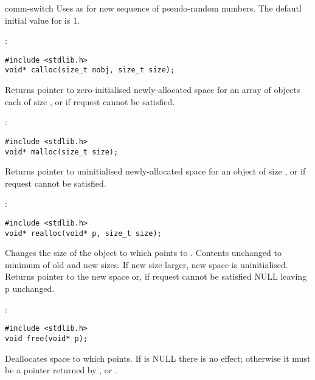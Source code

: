 \begin{Ventry2}{comm-switch  }
     Uses  as  for new sequence of pseudo-random
     numbers. The defautl initial  value for  is 1.

\item[calloc]
\label{item:calloc}
:
\begin{production}
\begin{verbatim}
#include <stdlib.h>
void* calloc(size_t nobj, size_t size);
\end{verbatim}
\end{production}

     Returns pointer to zero-initialised newly-allocated space for an
     array of  objects each of size , or  if
     request cannot be satisfied.

\item[malloc]
\label{item:malloc}
:
\begin{production}
\begin{verbatim}
#include <stdlib.h>
void* malloc(size_t size);
\end{verbatim}
\end{production}

     Returns pointer to uninitialised newly-allocated space for an
     object of size , or  if request cannot be
     satisfied.

\item[realloc]
\label{item:realloc}
:
\begin{production}
\begin{verbatim}
#include <stdlib.h>
void* realloc(void* p, size_t size);
\end{verbatim}
\end{production}

     Changes the size of the object to which  points to
     . Contents unchanged to minimum of old and new sizes. If
     new size larger, new space is uninitialised. Returns pointer to
     the new space or, if request cannot be satisfied NULL leaving p
     unchanged.

\item[free]
\label{item:free}
:
\begin{production}
\begin{verbatim}
#include <stdlib.h>
void free(void* p);
\end{verbatim}
\end{production}

     Deallocates space to which  points. If  is NULL there
     is no effect; otherwise it must be a pointer returned by ,
      or .


\end{Ventry2}
